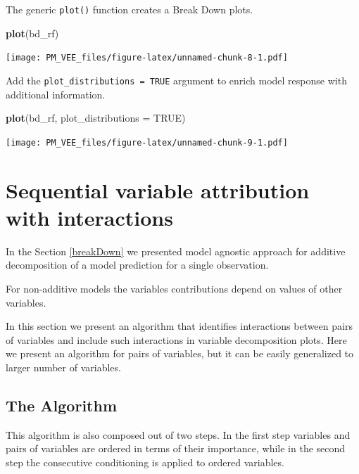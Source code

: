 \documentclass[]{krantz}
\newenvironment{Shaded}{\begin{snugshade}}{\end{snugshade}}
\newcommand{\DataTypeTok}[1]{\textcolor[rgb]{0.13,0.29,0.53}{#1}}
\newcommand{\KeywordTok}[1]{\textcolor[rgb]{0.13,0.29,0.53}{\textbf{#1}}}
\newcommand{\NormalTok}[1]{#1}
\newcommand{\OtherTok}[1]{\textcolor[rgb]{0.56,0.35,0.01}{#1}}
\theoremstyle{definition}
\theoremstyle{definition}
\theoremstyle{definition}
\theoremstyle{remark}
\begin{document}
The generic \texttt{plot()} function creates a Break Down plots.

\begin{Shaded}
\begin{Highlighting}[]
\KeywordTok{plot}\NormalTok{(bd_rf) }
\end{Highlighting}
\end{Shaded}

\texttt{[image: PM\_VEE\_files/figure-latex/unnamed-chunk-8-1.pdf]}

Add the \texttt{plot\_distributions\ =\ TRUE} argument to enrich model
response with additional information.

\begin{Shaded}
\begin{Highlighting}[]
\KeywordTok{plot}\NormalTok{(bd_rf, }\DataTypeTok{plot_distributions =} \OtherTok{TRUE}\NormalTok{) }
\end{Highlighting}
\end{Shaded}

\texttt{[image: PM\_VEE\_files/figure-latex/unnamed-chunk-9-1.pdf]}

\hypertarget{sequential-variable-attribution-with-interactions}{%
\section{Sequential variable attribution with
interactions}\label{sequential-variable-attribution-with-interactions}}

In the Section \ref{breakDown} we presented model agnostic approach for
additive decomposition of a model prediction for a single observation.

For non-additive models the variables contributions depend on values of
other variables.

In this section we present an algorithm that identifies interactions
between pairs of variables and include such interactions in variable
decomposition plots. Here we present an algorithm for pairs of
variables, but it can be easily generalized to larger number of
variables.

\hypertarget{the-algorithm-1}{%
\subsection{The Algorithm}\label{the-algorithm-1}}

This algorithm is also composed out of two steps. In the first step
variables and pairs of variables are ordered in terms of their
importance, while in the second step the consecutive conditioning is
applied to ordered variables.
\end{document}
